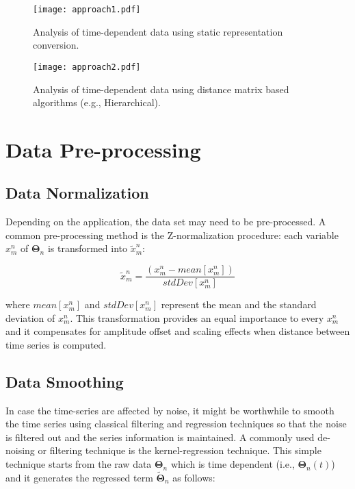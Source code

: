 \begin{figure}
    \centering
    \centerline{\texttt{[image: approach1.pdf]}}
    \caption{Analysis of time-dependent data using static representation conversion.}
    \label{fig:approach1}
\end{figure}

\begin{figure}
    \centering
    \centerline{\texttt{[image: approach2.pdf]}}
    \caption{Analysis of time-dependent data using distance matrix based algorithms (e.g., Hierarchical).}
    \label{fig:approach2}
\end{figure}


\section{Data Pre-processing}
\label{sec:preProcessing} 

\subsection{Data Normalization}
\label{sec:dataNormalization} 

Depending on the application, the data set may need to be pre-processed. A common pre-processing method is the 
Z-normalization procedure: each variable $x_m^n$ of $\bm{\Theta}_n$ is transformed into $\tilde{x}_m^n$:

\begin{equation}
  \tilde{x}_m^n = \dfrac{(x_m^n-mean[x_m^n])}{stdDev[x_m^n]}  
  \label{eq:Znormalization}
\end{equation}

where $mean[x_m^n]$ and $stdDev[x_m^n]$ represent the mean and the standard deviation of $x_m^n$. 
This transformation provides an equal importance to every $x_m^n$ and it compensates for amplitude offset 
and scaling effects when distance between time series is computed.

\subsection{Data Smoothing}
\label{sec:dataSmoothing} 

In case the time-series are affected by noise, it might be worthwhile to smooth the time series using classical 
filtering and regression techniques so that the noise is filtered out and the series information is maintained. 
A commonly used de-noising or filtering technique is the kernel-regression technique.
This simple technique starts from the raw data $\bm{\Theta}_n$ which is time dependent (i.e., $\bm{\Theta}_n(t)$) 
and it generates the regressed term $\bm{\tilde{\Theta}}_n$ as follows:

